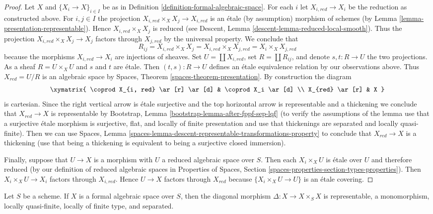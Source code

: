 \begin{proof}
\medskip\noindent
Let $X$ and $\{X_i \to X\}_{i \in I}$ be as in
Definition \ref{definition-formal-algebraic-space}.
For each $i$ let $X_{i, red} \to X_i$ be the reduction as
constructed above. For $i, j \in I$ the projection
$X_{i, red} \times_X X_j \to X_{i, red}$ is an \'etale (by assumption)
morphism of schemes (by Lemma \ref{lemma-presentation-representable}).
Hence $X_{i, red} \times_X X_j$ is reduced (see
Descent, Lemma \ref{descent-lemma-reduced-local-smooth}).
Thus the projection $X_{i, red} \times_X X_j \to X_j$ factors
through $X_{j, red}$ by the universal property. We conclude that
$$
R_{ij} = X_{i, red} \times_X X_j = X_{i, red} \times_X X_{j, red} =
X_i \times_X X_{j, red}
$$
because the morphisms $X_{i, red} \to X_i$ are injections of sheaves.
Set $U = \coprod X_{i, red}$, set
$R = \coprod R_{ij}$, and denote $s, t : R \to U$ the two
projections. As a sheaf $R = U \times_X U$ and $s$ and $t$
are \'etale. Then $(t, s) : R \to U$ defines an \'etale equivalence
relation by our observations above. Thus $X_{red} = U/R$ is an
algebraic space by Spaces, Theorem \ref{spaces-theorem-presentation}.
By construction the diagram
$$
\xymatrix{
\coprod X_{i, red} \ar[r] \ar[d] & \coprod X_i \ar[d] \\
X_{red} \ar[r] & X
}
$$
is cartesian. Since the right vertical arrow is \'etale surjective
and the top horizontal arrow is representable and a thickening
we conclude that $X_{red} \to X$ is representable by
Bootstrap, Lemma \ref{bootstrap-lemma-after-fppf-sep-lqf}
(to verify the assumptions of the lemma use that a surjective
\'etale morphism is surjective, flat, and locally of finite
presentation and use that thickenings are separated and locally quasi-finite).
Then we can use Spaces, Lemma
\ref{spaces-lemma-descent-representable-transformations-property}
to conclude that $X_{red} \to X$ is a thickening
(use that being a thickening is equivalent to being
a surjective closed immersion).

\medskip\noindent
Finally, suppose that $U \to X$ is a morphism with
$U$ a reduced algebraic space over $S$. Then each $X_i \times_X U$
is \'etale over $U$ and therefore reduced (by our definition of
reduced algebraic spaces in Properties of Spaces, Section
\ref{spaces-properties-section-types-properties}).
Then $X_i \times_X U \to X_i$ factors through $X_{i, red}$.
Hence $U \to X$ factors through $X_{red}$ because
$\{X_i \times_X U \to U\}$ is an \'etale covering.
\end{proof}

\begin{lemma}
\label{lemma-diagonal-formal-algebraic-space}
Let $S$ be a scheme. If $X$ is a formal algebraic space over
$S$, then the diagonal morphism $\Delta : X \to X \times_S X$
is representable, a monomorphism, locally quasi-finite,
locally of finite type, and separated.
\end{lemma}

